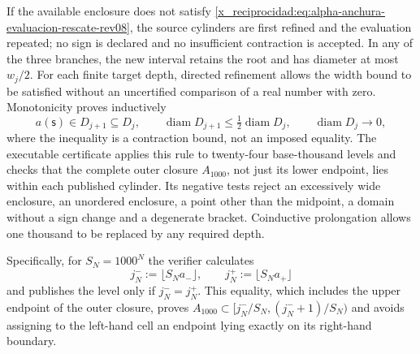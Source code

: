 If the available enclosure does not satisfy
\eqref{x_reciprocidad:eq:alpha-anchura-evaluacion-rescate-rev08}, the source cylinders are first
refined and the evaluation repeated; no sign is declared and no
insufficient contraction is accepted. In any of the three branches, the new
interval retains the root and has diameter at most \(w_j/2\). For each
finite target depth, directed refinement allows the width bound to be
satisfied without an uncertified comparison of a real number with zero.
Monotonicity proves inductively
\begin{equation}
 a(\mathsf s)\in D_{j+1}\subseteq D_j,\qquad
 \operatorname{diam}D_{j+1}\leq
 \tfrac12\operatorname{diam}D_j,
 \qquad \operatorname{diam}D_j\longrightarrow0,
 \label{x_reciprocidad:eq:alpha-biseccion-racional}
\end{equation}
where the inequality is a contraction bound, not an imposed equality.
The executable certificate applies
this rule to twenty-four base-thousand levels and checks that the complete outer
closure \(A_{1000}\), not just its lower endpoint, lies within
each published cylinder. Its negative tests reject an excessively wide
enclosure, an unordered enclosure, a point other than the midpoint, a domain without
a sign change and a degenerate bracket. Coinductive prolongation allows
one thousand to be replaced by any required depth.

Specifically, for \(S_N=1000^N\) the verifier calculates
\begin{equation}
 j_N^-:=\lfloor S_Na_-\rfloor,
 \qquad j_N^+:=\lfloor S_Na_+\rfloor
 \label{x_reciprocidad:eq:alpha-indices-cilindro-dirigidos-rev08}
\end{equation}
and publishes the level only if \(j_N^-=j_N^+\). This equality, which includes the
upper endpoint of the outer closure, proves
\(A_{1000}\subset[j_N^-/S_N,(j_N^-+1)/S_N)\) and avoids assigning to the left-hand
cell an endpoint lying exactly on its right-hand boundary.

